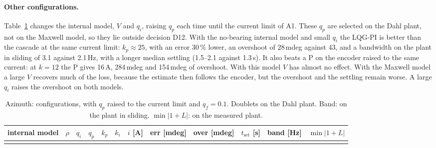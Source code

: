 \documentclass[10pt,a4paper]{article}
\numberwithin{equation}{section}
\begin{document}
\paragraph{Other configurations.} Table~\ref{tab:cmo} changes the internal model, $V$ and $q_i$, raising $q_p$ each time until the current limit of A1. These $q_p$ are selected on the Dahl plant, not on the Maxwell model, so they lie outside decision D12. With the no-bearing internal model and small $q_i$ the LQG-PI is better than the cascade at the same current limit: $k_p\approx25$, with an error 30\,\% lower, an overshoot of 28\,mdeg against 43, and a bandwidth on the plant in sliding of 3.1 against 2.1\,Hz, with a longer median settling (1.5--2.1 against 1.3\,s). It also beats a P on the encoder raised to the same current: at $k=12$ the P gives 16\,A, 284\,mdeg and 154\,mdeg of overshoot. With this model $V$ has almost no effect. With the Maxwell model a large $V$ recovers much of the loss, because the estimate then follows the encoder, but the overshoot and the settling remain worse. A large $q_i$ raises the overshoot on both models.

\begin{table}[H]\centering\footnotesize\setlength{\tabcolsep}{3pt}
\caption{Azimuth: configurations, with $q_p$ raised to the current limit and $q_f=0.1$. Doublets on the Dahl plant. Band: on the plant in sliding. $\min|1+L|$: on the measured plant.}\label{tab:cmo}
\begin{tabular}{lrrrrrrrrrrr}\toprule
internal model & $\rho$ & $q_i$ & $q_p$ & $k_p$ & $k_i$ & $i$ [A] & err [mdeg] & over [mdeg] & $t_\mathrm{set}$ [s] & band [Hz] & $\min|1+L|$ \\ \midrule
\\ \bottomrule
\end{tabular}\end{table}
\end{document}
